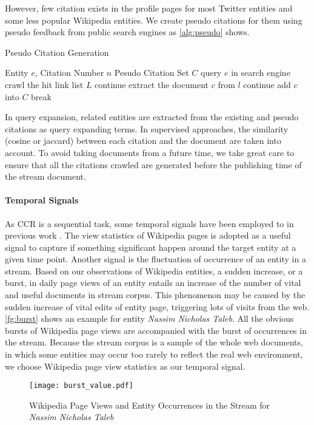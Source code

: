 \documentclass{sig-alternate}
\begin{document}
However, few citation exists in the profile pages for most Twitter entities and some less popular Wikipedia entities. We create pseudo citations for them using pseudo feedback from public search engines as \autoref{alg:pseudo} shows.
\begin{algorithm}
\caption{Pseudo Citation Generation}\label{alg:pseudo}
\begin{algorithmic}[1]
\Require Entity $e$, Citation Number $n$
\Ensure Pesudo Citation Set $C$
\State query $e$ in search engine
\State crawl the hit link list $L$
	\State continue
\Else
	\State extract the document $c$ from $l$
		\State continue
	\Else
		\State add $c$ into $C$
			\State break
		\EndIf
	\EndIf
\EndIf
\EndFor
\end{algorithmic}
\end{algorithm}

In query expansion, related entities are extracted from the existing and pseudo citations as query expanding terms. In supervised approaches, the similarity (cosine or jaccard) between each citation and the document are taken into account. To avoid taking documents from a future time, we take great care to ensure that all the citations crawled are generated before the publishing time of the stream document.

\paragraph{Temporal Signals}
As CCR is a sequential task, some temporal signals have been employed to in previous work \cite{Balog:2013:MCA:2491748.2491775, bonnefoy2013lsis, Bonnefoy:2013:WDE:2484028.2484180}. The view statistics of Wikipedia pages is adopted as a useful signal to capture if something significant happen around the target entity at a given time point. Another signal is the fluctuation of occurrence of an entity in a stream. Based on our observations of Wikipedia entities, a sudden increase, or a burst, in daily page views of an entity entails an increase of the number of vital and useful documents in stream corpus.
This phenomenon may be caused by the sudden increase of vital edits of entity page, triggering lots of visits from the web. \autoref{fg:burst} shows an example for entity \textit{Nassim Nicholas Taleb}. All the obvious bursts of Wikipedia page views are accompanied with the burst of occurrences in the stream. Because the stream corpus is a sample of the whole web documents, in which some entities may occur too rarely to reflect the real web environment, we choose Wikipedia page view statistics as our temporal signal.
\begin{figure}[thbp]
\centering
\texttt{[image: burst\_value.pdf]}
\caption{Wikipedia Page Views and Entity Occurrences in the Stream for \textit{Nassim Nicholas Taleb} }
\label{fg:burst}
\end{figure}
\end{document}
